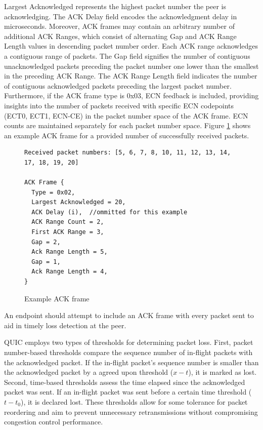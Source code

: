 Largest Acknowledged represents the highest packet number the peer is acknowledging. The ACK Delay field encodes the acknowledgment delay in microseconds. Moreover, ACK frames may contain an arbitrary number of additional ACK Ranges, which consist of alternating Gap and ACK Range Length values in descending packet number order. Each ACK range acknowledges a contiguous range of packets. The Gap field signifies the number of contiguous unacknowledged packets preceding the packet number one lower than the smallest in the preceding ACK Range. The ACK Range Length field indicates the number of contiguous acknowledged packets preceding the largest packet number. Furthermore, if the ACK frame type is 0x03, ECN feedback is included, providing insights into the number of packets received with specific ECN codepoints (ECT0, ECT1, ECN-CE) in the packet number space of the ACK frame. ECN counts are maintained separately for each packet number space. Figure \ref{ack_frame_example} shows an example ACK frame for a provided number of successfully received packets.

\begin{figure}[htb]
    \centering
\begin{verbatim}
Received packet numbers: [5, 6, 7, 8, 10, 11, 12, 13, 14, 17, 18, 19, 20]

ACK Frame {
  Type = 0x02,
  Largest Acknowledged = 20,
  ACK Delay (i),  //ommitted for this example
  ACK Range Count = 2,
  First ACK Range = 3,        
  Gap = 2,
  Ack Range Length = 5,
  Gap = 1,
  Ack Range Length = 4,
}
\end{verbatim}
    \caption{Example ACK frame}
    \label{ack_frame_example}
\end{figure}

An endpoint should attempt to include an ACK frame with every packet sent to aid in timely loss detection at the peer. 

QUIC employs two types of thresholds for determining packet loss. First, packet number-based thresholds compare the sequence
number of in-flight packets with the acknowledged packet. If the in-flight packet's sequence number is smaller than the
acknowledged packet by a agreed upon threshold ($x - t$), it is marked as lost. Second, time-based thresholds assess the time
elapsed since the acknowledged packet was sent. If an in-flight packet was sent before a certain time threshold ($t - t_{0}$), it is declared lost. These thresholds allow for some tolerance for packet reordering and aim to prevent unnecessary retransmissions without compromising congestion control performance.

